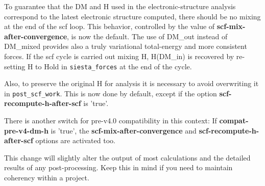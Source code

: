 \documentclass{article}
\newcommand{\opt}[1]{\textbf{#1}}
\newcommand{\code}[1]{\texttt{#1}}
\begin{document}
\begin{description}
\begin{itemize}
    To guarantee that the DM and H used in the electronic-structure
    analysis correspond to the latest electronic structure computed,
    there should be no mixing at the end of the scf loop. This
    behavior, controlled by the value of \opt{scf-mix-after-convergence}, is
    now the default. The use of DM\_out instead of DM\_mixed provides
    also a truly variational total-energy and more consistent
    forces. If the scf cycle is carried out mixing H, H(DM\_in) is
    recovered by re-setting H to Hold in \code{siesta\_forces} at the end of
    the cycle.

    Also, to preserve the original H for analysis it is necessary to
    avoid overwriting it in \code{post\_scf\_work}. This is now done by
    default, except if the option \opt{scf-recompute-h-after-scf} is
    'true'.

    There is another switch for pre-v4.0 compatibility in this
    context: If \opt{compat-pre-v4-dm-h} is 'true', the
    \opt{scf-mix-after-convergence} and \opt{scf-recompute-h-after-scf}
    options are activated too.

    This change will slightly alter the output of most calculations
    and the detailed results of any post-processing. Keep this in mind
    if you need to maintain coherency within a project.
    
  \end{itemize}

\end{description}
\end{document}
